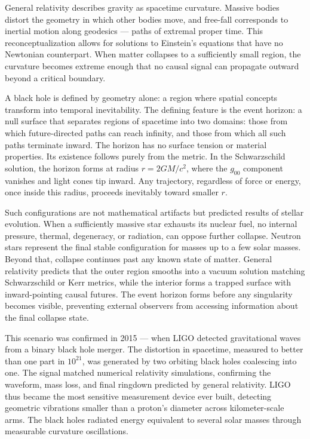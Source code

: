 General relativity describes gravity as spacetime curvature. Massive bodies distort the geometry in which other bodies move, and free-fall corresponds to inertial motion along geodesics — paths of extremal proper time. This reconceptualization allows for solutions to Einstein's equations that have no Newtonian counterpart. When matter collapses to a sufficiently small region, the curvature becomes extreme enough that no causal signal can propagate outward beyond a critical boundary.

A black hole is defined by geometry alone: a region where spatial concepts transform into temporal inevitability. The defining feature is the event horizon: a null surface that separates regions of spacetime into two domains: those from which future-directed paths can reach infinity, and those from which all such paths terminate inward. The horizon has no surface tension or material properties. Its existence follows purely from the metric. In the Schwarzschild solution, the horizon forms at radius $r = 2GM/c^2$, where the $g_{00}$ component vanishes and light cones tip inward. Any trajectory, regardless of force or energy, once inside this radius, proceeds inevitably toward smaller $r$. 

Such configurations are not mathematical artifacts but predicted results of stellar evolution. When a sufficiently massive star exhausts its nuclear fuel, no internal pressure, thermal, degeneracy, or radiation, can oppose further collapse. Neutron stars represent the final stable configuration for masses up to a few solar masses. Beyond that, collapse continues past any known state of matter. General relativity predicts that the outer region smooths into a vacuum solution matching Schwarzschild or Kerr metrics, while the interior forms a trapped surface with inward-pointing causal futures. The event horizon forms before any singularity becomes visible, preventing external observers from accessing information about the final collapse state.

This scenario was confirmed in 2015 — when LIGO detected gravitational waves from a binary black hole merger. The distortion in spacetime, measured to better than one part in $10^{21}$, was generated by two orbiting black holes coalescing into one. The signal matched numerical relativity simulations, confirming the waveform, mass loss, and final ringdown predicted by general relativity. LIGO thus became the most sensitive measurement device ever built, detecting geometric vibrations smaller than a proton's diameter across kilometer-scale arms. The black holes radiated energy equivalent to several solar masses through measurable curvature oscillations.

